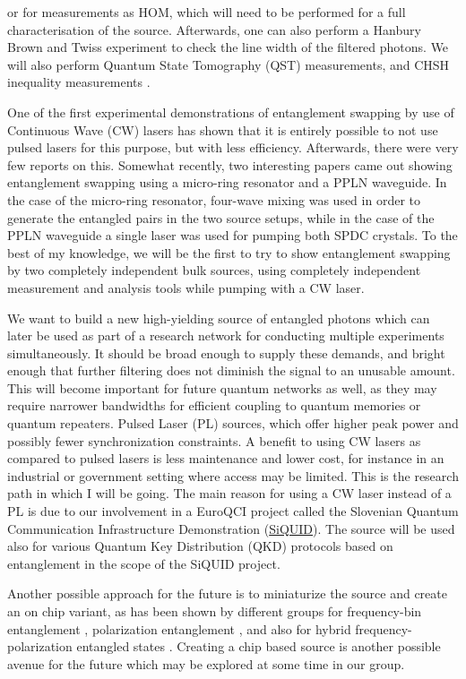 \documentclass{article}
\theoremstyle{mytheoremstyle}
\theoremstyle{mytheoremstyle}
\theoremstyle{myproblemstyle}
\begin{document}
or for measurements as HOM, which will need to be performed for a full characterisation of the source.
Afterwards, one can also perform a Hanbury Brown and Twiss \cite{Brown_Twiss_1954} experiment to check the line width of the filtered photons.
We will also perform Quantum State Tomography (QST) measurements, and CHSH inequality measurements \cite{Clauser_Horne_Shimony_Holt_1969}.
\par One of the first \cite{Halder_Beveratos_Jorel_Zbinden_Simon_Scarani_Gisin_2007} experimental demonstrations of entanglement
swapping by use of Continuous Wave (CW) lasers has shown that it is entirely possible to not use pulsed lasers for this purpose, but with less efficiency.
Afterwards, there were very few reports
on this. Somewhat recently, two \cite{Samara_Maring_Martin_Raja_Kippenberg_Zbinden_Thew_2021,Tsujimoto_Tanaka_Iwasaki_Ikuta_Miki_Yamashita_Terai_Yamamoto_Koashi_Imoto_2018}
interesting papers came out showing entanglement swapping using a micro-ring resonator and a PPLN waveguide. In the case of the micro-ring resonator, four-wave mixing
was used in order to generate the entangled pairs in the two source setups, while in the case of the PPLN waveguide a single laser was used for pumping both SPDC crystals.
To the best of my knowledge, we will be the first to try to show entanglement swapping by two completely independent bulk sources, using completely independent measurement
and analysis tools while pumping with a CW laser.
\par We want to build a new high-yielding source of entangled photons which can later be used as part of a research network
for conducting multiple experiments simultaneously. It should be broad enough to supply these demands, and bright enough
that further filtering does not diminish the signal to an unusable amount. This will become important for future quantum
networks as well, as they may require narrower bandwidths for efficient coupling to quantum memories or quantum repeaters.
Pulsed Laser (PL) sources, which offer higher peak power and possibly fewer synchronization constraints.
A benefit to using CW lasers as compared to pulsed lasers is less maintenance and lower cost, for instance in an industrial or government
setting where access may be limited. This is the research path in which I will be going.
The main reason for using a CW laser instead of a PL is due to our involvement in a EuroQCI project called the Slovenian
Quantum Communication Infrastructure Demonstration (\href{https://siquid.fmf.uni-lj.si/}{SiQUID}). The source will be used also for various Quantum
Key Distribution (QKD) protocols based on entanglement in the scope of the SiQUID project.
\par Another possible approach for the future is to miniaturize the source and create
an on chip variant, as has been shown by different groups for frequency-bin entanglement \cite{S_G_S_C_F_B_L_G_B_2022},
polarization entanglement \cite{L_Z_F_F_L_L_W_R_D_X_etal._2017}, and also for hybrid frequency-polarization
entangled states \cite{F_R_D_F_L_M_A_B_D_2023}.
Creating a chip based source is another possible avenue for the future which may be explored at some time in our group.
\end{document}

